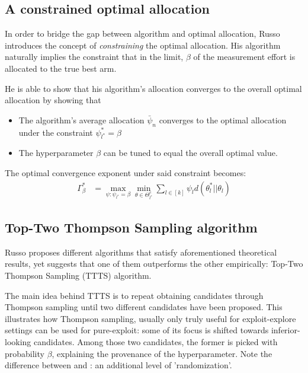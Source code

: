 \subsection{A constrained optimal allocation}

In order to bridge the gap between algorithm and optimal allocation, Russo
introduces the concept of \emph{constraining} the optimal allocation. His
algorithm naturally implies the constraint that in the limit, $\beta$ of the
measurement effort is allocated to the true best arm.

He is able to show that his algorithm's allocation converges to the overall
optimal allocation by showing that
\begin{itemize}
  \item The algorithm's average allocation $\bar{\psi}_n$ converges to the
  optimal allocation under the constraint $\psi_{l^*}^* = \beta$
  \item The hyperparameter $\beta$ can be tuned to equal the overall optimal
  value.
\end{itemize}
The optimal convergence exponent under said constraint becomes:
\begin{align}
  \Gamma^*_{\beta} &= \max_{\psi: \psi_{l^*} = \beta} \min_{\theta \in
      \Theta^c_{l^*}} \sum_{l \in [k]} \psi_l d(\theta_l^* || \theta_l)
\end{align}

\subsection{Top-Two Thompson Sampling algorithm}

Russo proposes different algorithms that satisfy aforementioned theoretical
results, yet suggests that one of them outperforms the other empirically:
Top-Two Thompson Sampling (TTTS) algorithm.

The main idea behind TTTS is to repeat obtaining candidates through Thompson
sampling until two different candidates have been proposed. This illustrates how
Thompson sampling, usually only truly useful for exploit-explore settings can be
used for pure-exploit: some of its focus is shifted towards inferior-looking
candidates. Among those two candidates, the former is picked with probability
$\beta$, explaining the provenance of the hyperparameter. Note the difference
between  and : an additional level of
'randomization'.

